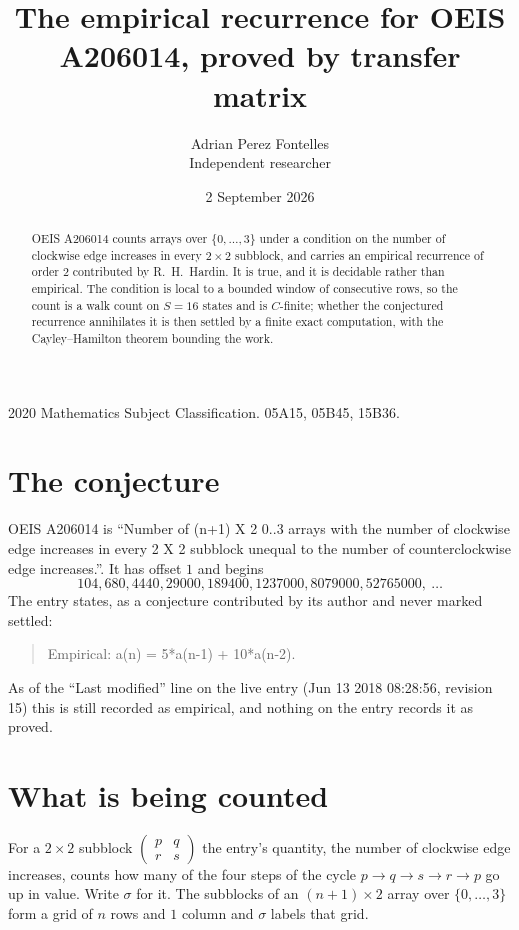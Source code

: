 \documentclass[11pt,a4paper]{article}
\title{The empirical recurrence for OEIS A206014, proved by transfer matrix}
\author{Adrian Perez Fontelles\\ \small Independent researcher}
\date{2 September 2026}
\theoremstyle{plain}
\theoremstyle{definition}
\begin{document}
\maketitle

\begin{abstract}
OEIS A206014 counts arrays over $\{0,\dots,3\}$ under a condition on the number of clockwise edge increases
in every $2\times2$ subblock, and carries an empirical recurrence of order $2$ contributed by
R.~H.~Hardin. It is true, and it is decidable rather than empirical. The condition is local to
a bounded window of consecutive rows, so the count is a walk count on $S=16$ states and is
$C$-finite; whether the conjectured recurrence annihilates it is then settled by a finite exact
computation, with the Cayley--Hamilton theorem bounding the work.
\end{abstract}

\noindent\small 2020 Mathematics Subject Classification. 05A15, 05B45, 15B36.\normalsize

\section{The conjecture}

OEIS A206014 is ``Number of (n+1) X 2 0..3 arrays with the number of clockwise edge increases in every 2 X 2 subblock unequal to the number of counterclockwise edge increases.''. It has offset $1$ and begins
\[
104, 680, 4440, 29000, 189400, 1237000, 8079000, 52765000,\ \dots
\]
The entry states, as a conjecture contributed by its author and never marked settled:
\begin{quote}
Empirical: a(n) = 5*a(n-1) + 10*a(n-2).
\end{quote}
As of the ``Last modified'' line on the live entry (Jun 13 2018 08:28:56, revision 15) this is still
recorded as empirical, and nothing on the entry records it as proved.

\section{What is being counted}

For a $2\times2$ subblock $\begin{pmatrix}p&q\\r&s\end{pmatrix}$ the
entry's quantity, the number of clockwise edge increases, counts how many of the four steps of the cycle $p\to q\to s\to r\to p$ go up in value. Write $\sigma$ for it. The subblocks of an
$(n+1)\times2$ array over $\{0,\dots,3\}$ form a grid of $n$ rows and $1$
column and $\sigma$ labels that grid.
\end{document}
